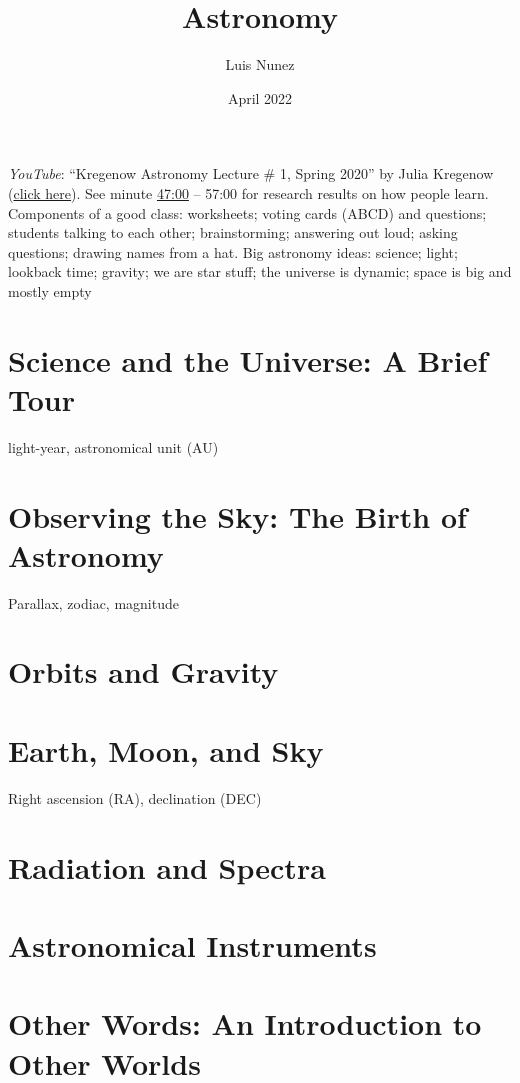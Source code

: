 \documentclass{article}
\title{Astronomy}
\author{Luis Nunez}
\date{April 2022}
\begin{document}
 \textit{YouTube}: ``Kregenow Astronomy Lecture \# 1, Spring 2020'' by Julia Kregenow (\href{https://youtu.be/uMQ0-Kr1ySI}{click here}). See minute \href{https://youtu.be/uMQ0-Kr1ySI?t=2872}{47:00} -- 57:00 for research results on how people learn. Components of a good class: worksheets; voting cards (ABCD) and questions; students talking to each other; brainstorming; answering out loud; asking questions; drawing names from a hat. Big astronomy ideas: science; light; lookback time; gravity; we are star stuff; the universe is dynamic; space is big and mostly empty

\section{Science and the Universe: A Brief Tour}
light-year, astronomical unit (AU)
\section{Observing the Sky: The Birth of Astronomy}
Parallax, zodiac, magnitude
\section{Orbits and Gravity}
\section{Earth, Moon, and Sky}
Right ascension (RA), declination (DEC)


\section{Radiation and Spectra}
\section{Astronomical Instruments}
\section{Other Words: An Introduction to Other Worlds}
\section{}
\section{}
\section{}
\end{document}

